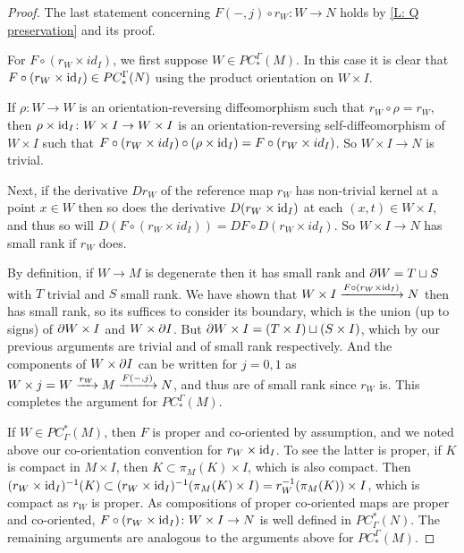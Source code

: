 \begin{proof}
	The last statement concerning $F(-,j) \circ r_W \colon W \to N$ holds by \cref{L: Q preservation} and its proof.

	For	$F \circ (r_W \times id_I)$, we first suppose $W \in PC_*^\Gamma(M)$.
	In this case it is clear that $F \circ (r_W \times \mathrm{id}_I) \in PC_*^\Gamma(N)$ using the product orientation on $W \times I$.

	If $\rho \colon W \to W$ is an orientation-reversing diffeomorphism such that $r_W \circ \rho = r_W$, then
	$\rho \times \mathrm{id}_I \colon W \times I \to W \times I$ is an orientation-reversing self-diffeomorphism of $W \times I$ such that $F \circ (r_W \times id_I) \circ (\rho \times \mathrm{id}_I) = F \circ (r_W \times id_I)$.
	So $W \times I \to N$ is trivial.

	\begin{comment}
	\end{comment}

	Next, if the derivative $Dr_W$ of the reference map $r_W$ has non-trivial kernel at a point $x \in W$ then so does the derivative $D(r_W \times \mathrm{id}_I)$ at each $(x,t) \in W \times I$, and thus so
	will $D(F \circ (r_W \times id_I)) = DF \circ D(r_W \times id_I)$.
	So $W \times I \to N$ has small rank if $r_W$ does.

	By definition, if $W \to M$ is degenerate then it has small rank and $\partial W = T \sqcup S$ with $T$ trivial and $S$ small rank.
	We have shown that $W \times I \xrightarrow{F\circ(r_W\times\mathrm{id}_I)} N$ then has small rank, so its suffices to consider its boundary,
	which is the union (up to signs) of $\partial W \times I$ and $W \times \partial I$.
	But $\partial W \times I = (T \times I) \sqcup (S \times I)$, which by our previous
	arguments are trivial and of small rank respectively.
	And the components of $W \times \partial I$ can be written for $j = 0, 1$ as $W \times j = W \xrightarrow{r_W} M \xrightarrow{F(-,j)} N$, and thus are of small rank since $r_W$ is.
	This completes the argument for $PC_*^\Gamma(M)$.

	If $W \in PC^*_\Gamma(M)$, then $F$ is proper and co-oriented by assumption, and we noted above our co-orientation convention for $r_W \times \mathrm{id}_I$.
	To see the latter is proper, if $K$ is compact in $M \times I$, then $K \subset \pi_M(K) \times I$, which is also compact.
	Then $(r_W \times \mathrm{id}_I)^{-1}(K) \subset (r_W \times \mathrm{id}_I)^{-1}(\pi_M(K) \times I) = r_W^{-1}(\pi_M(K)) \times I$, which is compact as $r_W$ is proper.
	As compositions of proper co-oriented maps are proper and co-oriented, $F \circ (r_W \times \mathrm{id}_I) \colon W \times I \to N$ is well defined in $PC^*_\Gamma(N)$.
	The remaining arguments are analogous to the arguments above for $PC_*^\Gamma(M)$.
\end{proof}

